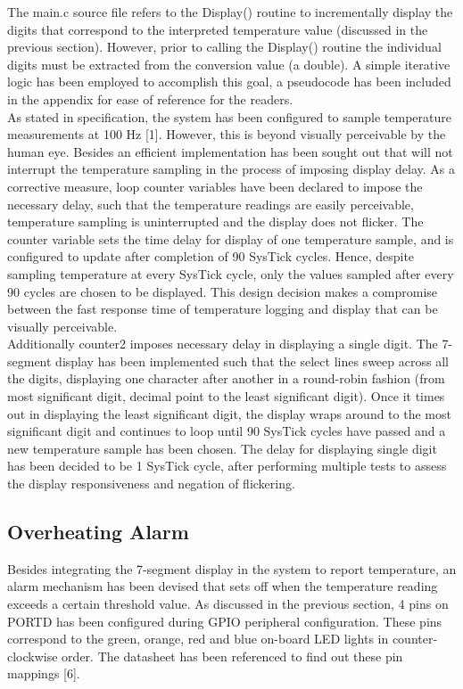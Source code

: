\documentclass{article}
\begin{document}
\noindent The main.c source file refers to the Display() routine to incrementally display the digits that correspond to the interpreted temperature value (discussed in the previous section). However, prior to calling the Display() routine the individual digits must be extracted from the conversion value (a double). A simple iterative logic has been employed to accomplish this goal, a pseudocode has been included in the appendix for ease of reference for the readers. \\

\noindent As stated in specification, the system has been configured to sample temperature measurements at 100 Hz [1]. However, this is beyond visually perceivable by the human eye. Besides an efficient implementation has been sought out that will not interrupt the temperature sampling in the process of imposing display delay. As a corrective measure, loop counter variables have been declared to impose the necessary delay, such that the temperature readings are easily perceivable, temperature sampling is uninterrupted and the display does not flicker. The counter variable sets the time delay for display of one temperature sample, and is configured to update after completion of 90 SysTick cycles. Hence, despite sampling temperature at every SysTick cycle, only the values sampled after every 90 cycles are chosen to be displayed. This design decision makes a compromise between the fast response time of temperature logging and display that can be visually perceivable. \\

\noindent Additionally counter2 imposes necessary delay in displaying a single digit. The 7-segment display has been implemented such that the select lines sweep across all the digits, displaying one character after another in a round-robin fashion (from most significant digit, decimal point to the least significant digit). Once it times out in displaying the least significant digit, the display wraps around to the most significant digit and continues to loop until 90 SysTick cycles have passed and a new temperature sample has been chosen. The delay for displaying single digit has been decided to be 1 SysTick cycle, after performing multiple tests to assess the display responsiveness and negation of flickering.

\subsection{Overheating Alarm}
Besides integrating the 7-segment display in the system to report temperature, an alarm mechanism has been devised that sets off when the temperature reading exceeds a certain threshold value. As discussed in the previous section, 4 pins on PORTD has been configured during GPIO peripheral configuration. These pins correspond to the green, orange, red and blue on-board LED lights in counter-clockwise order. The datasheet has been referenced to find out these pin mappings [6].\\
\end{document}
